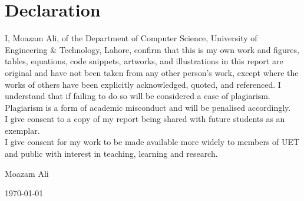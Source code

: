 \documentclass[a4paper,11pt,oneside]{book}
\begin{document}
    
    \newpage
    \thispagestyle{empty}
    \chapter*{\Large Declaration}
    I,
    Moazam Ali, %
    of the Department of Computer Science, University of Engineering \& Technology, Lahore, confirm that this is my own work and figures, tables, equations, code snippets, artworks, and illustrations in this report are original and have not been taken from any other person's work, except where the works of others have been explicitly acknowledged, quoted, and referenced. I understand that if failing to do so will be considered a case of plagiarism. Plagiarism is a form of academic misconduct and will be penalised accordingly. \\
    
    \noindent
    I give consent to a copy of my report being shared with future students as an exemplar. \\
    
    \noindent
    I give consent for my work to be made available more widely to members of UET and public with interest in teaching, learning and research.
    ~\\[1cm]
    \begin{flushright}
	Moazam Ali %
    
    \today
    \end{flushright}

     
    
\end{document}
